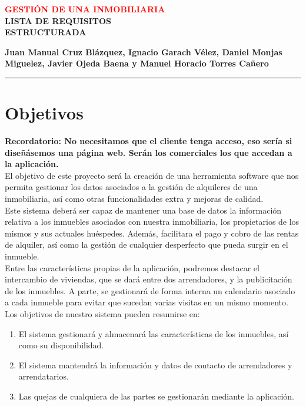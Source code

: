 \documentclass[10pt,a4paper]{article}
\author{Juan Manual Cruz Blázquez, Ignacio Garach Vélez, Daniel Monjas Miguelez, Javier Ojeda Baena, Manuel Horacio Torres Cañero}
\begin{document}
\BgThispage
\begin{flushright}
\textcolor{red}{\bfseries\Large GESTIÓN DE UNA INMOBILIARIA}\vspace{1cm}\\
{\bfseries\Large LISTA DE REQUISITOS\vspace{0.5cm}\\
ESTRUCTURADA}\vspace{1cm}\\
\end{flushright}
\begin{center}
{\large\bfseries Juan Manual Cruz Blázquez, Ignacio Garach Vélez, Daniel Monjas Miguelez, Javier Ojeda Baena y Manuel Horacio Torres Cañero}
\end{center}
\rule{17 cm}{1 pt}
\vspace{1cm}

\tableofcontents

\newpage

\section{Objetivos}
\textbf{Recordatorio: No necesitamos que el cliente tenga acceso, eso sería si diseñásemos una página web. Serán los comerciales los que accedan a la aplicación.}\\

El objetivo de este proyecto será la creación de una herramienta software que nos permita gestionar los datos asociados a la gestión de alquileres de una inmobiliaria, así como otras funcionalidades extra y mejoras de calidad.\\

Este sistema deberá ser capaz de mantener una base de datos la información relativa a los inmuebles asociados con nuestra inmobiliaria, los propietarios de los mismos y sus actuales huéspedes. Además, facilitara el pago y cobro de las rentas de alquiler, así como la gestión de cualquier desperfecto que pueda surgir en el inmueble.\\

Entre las características propias de la aplicación, podremos destacar el intercambio de viviendas, que se dará entre dos arrendadores, y la publicitación de los inmuebles. A parte, se gestionará de forma interna un calendario asociado a cada inmueble para evitar que sucedan varias visitas en un mismo momento.\\

Los objetivos de nuestro sistema pueden resumirse en:
\begin{enumerate}
\item El sistema gestionará y almacenará las características de los inmuebles, así como su disponibilidad.
\item El sistema mantendrá la información y datos de contacto de arrendadores y arrendatarios.
\item Las quejas de cualquiera de las partes se gestionarán mediante la aplicación.
\end{enumerate}
\end{document}
